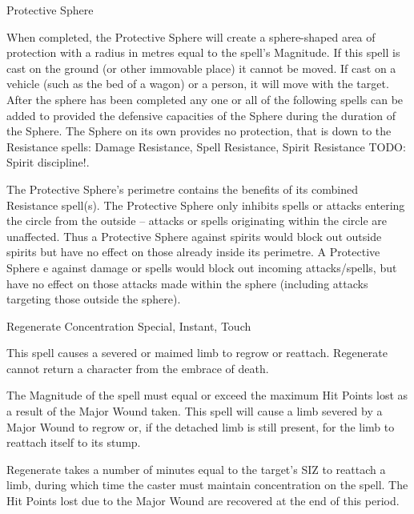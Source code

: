 \begin{samepage}
\begin{rpg-spell}
{Protective Sphere}
{}

When completed, the Protective Sphere will create a sphere-shaped area of protection with a radius in metres equal to the spell’s Magnitude. If this spell is cast on the ground (or other immovable place) it cannot be moved. If cast on a vehicle (such as the bed of a wagon) or a person, it will move with the target.  After the sphere has been completed any one or all of the following spells can be added to provided the defensive capacities of the Sphere during the duration of the Sphere. The Sphere on its own provides no protection, that is down to the Resistance spells: Damage Resistance, Spell Resistance, Spirit Resistance TODO: Spirit discipline!.

The Protective Sphere’s perimetre contains the benefits of its combined Resistance spell(s). The Protective Sphere only inhibits spells or attacks entering the circle from the outside – attacks or spells originating within the circle are unaffected. Thus a Protective Sphere against spirits would block out outside spirits but have no effect on those already inside its perimetre. A Protective Sphere e against damage or spells would block out incoming attacks/spells, but have no effect on those attacks made within the sphere (including attacks targeting those outside the sphere). 
\end{rpg-spell}
\end{samepage}


\begin{samepage}
\begin{rpg-spell}
{Regenerate}
{Concentration Special, Instant, Touch}

This spell causes a severed or maimed limb to regrow or reattach. Regenerate cannot return a character from the embrace of death. 

The Magnitude of the spell must equal or exceed the maximum Hit Points lost as a result of the Major Wound taken. This spell will cause a limb severed by a Major Wound to regrow or, if the detached limb is still present, for the limb to reattach itself to its stump. 

Regenerate takes a number of minutes equal to the target’s SIZ to reattach a limb, during which time the caster must maintain concentration on the spell. The Hit Points lost due to the Major Wound are recovered at the end of this period.
\end{rpg-spell}
\end{samepage}


